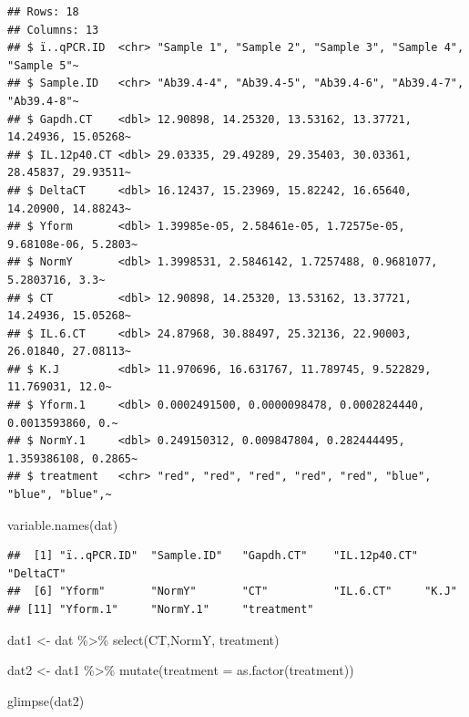 \documentclass[
]{book}
\newenvironment{Shaded}{\begin{snugshade}}{\end{snugshade}}
\newcommand{\AttributeTok}[1]{\textcolor[rgb]{0.77,0.63,0.00}{#1}}
\newcommand{\FunctionTok}[1]{\textcolor[rgb]{0.00,0.00,0.00}{#1}}
\newcommand{\NormalTok}[1]{#1}
\newcommand{\OtherTok}[1]{\textcolor[rgb]{0.56,0.35,0.01}{#1}}
\newcommand{\SpecialCharTok}[1]{\textcolor[rgb]{0.00,0.00,0.00}{#1}}
\begin{document}
\begin{verbatim}
## Rows: 18
## Columns: 13
## $ ï..qPCR.ID  <chr> "Sample 1", "Sample 2", "Sample 3", "Sample 4", "Sample 5"~
## $ Sample.ID   <chr> "Ab39.4-4", "Ab39.4-5", "Ab39.4-6", "Ab39.4-7", "Ab39.4-8"~
## $ Gapdh.CT    <dbl> 12.90898, 14.25320, 13.53162, 13.37721, 14.24936, 15.05268~
## $ IL.12p40.CT <dbl> 29.03335, 29.49289, 29.35403, 30.03361, 28.45837, 29.93511~
## $ DeltaCT     <dbl> 16.12437, 15.23969, 15.82242, 16.65640, 14.20900, 14.88243~
## $ Yform       <dbl> 1.39985e-05, 2.58461e-05, 1.72575e-05, 9.68108e-06, 5.2803~
## $ NormY       <dbl> 1.3998531, 2.5846142, 1.7257488, 0.9681077, 5.2803716, 3.3~
## $ CT          <dbl> 12.90898, 14.25320, 13.53162, 13.37721, 14.24936, 15.05268~
## $ IL.6.CT     <dbl> 24.87968, 30.88497, 25.32136, 22.90003, 26.01840, 27.08113~
## $ K.J         <dbl> 11.970696, 16.631767, 11.789745, 9.522829, 11.769031, 12.0~
## $ Yform.1     <dbl> 0.0002491500, 0.0000098478, 0.0002824440, 0.0013593860, 0.~
## $ NormY.1     <dbl> 0.249150312, 0.009847804, 0.282444495, 1.359386108, 0.2865~
## $ treatment   <chr> "red", "red", "red", "red", "red", "blue", "blue", "blue",~
\end{verbatim}

\begin{Shaded}
\begin{Highlighting}[]
\FunctionTok{variable.names}\NormalTok{(dat)}
\end{Highlighting}
\end{Shaded}

\begin{verbatim}
##  [1] "ï..qPCR.ID"  "Sample.ID"   "Gapdh.CT"    "IL.12p40.CT" "DeltaCT"    
##  [6] "Yform"       "NormY"       "CT"          "IL.6.CT"     "K.J"        
## [11] "Yform.1"     "NormY.1"     "treatment"
\end{verbatim}

\begin{Shaded}
\begin{Highlighting}[]
\NormalTok{dat1 }\OtherTok{\textless{}{-}}\NormalTok{ dat }\SpecialCharTok{\%\textgreater{}\%}
  \FunctionTok{select}\NormalTok{(CT,NormY, treatment)}

\NormalTok{dat2 }\OtherTok{\textless{}{-}}\NormalTok{ dat1 }\SpecialCharTok{\%\textgreater{}\%}
          \FunctionTok{mutate}\NormalTok{(}\AttributeTok{treatment =} \FunctionTok{as.factor}\NormalTok{(treatment))}
   
\FunctionTok{glimpse}\NormalTok{(dat2)       }
\end{Highlighting}
\end{Shaded}
\end{document}

